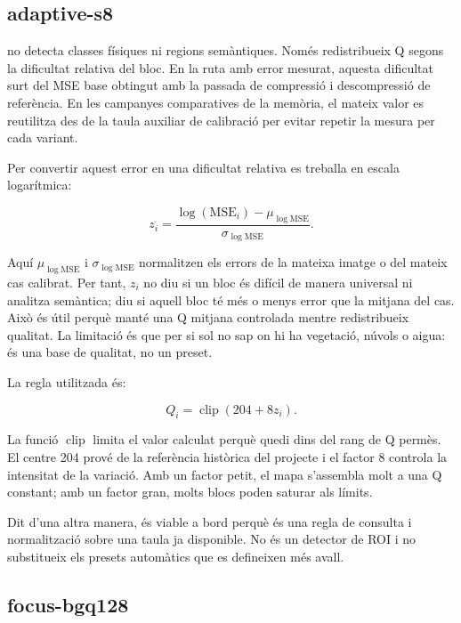 \subsection{adaptive-s8}

 no detecta classes físiques ni regions semàntiques. Només
redistribueix Q segons la dificultat relativa del bloc. En la ruta amb error
mesurat, aquesta dificultat surt del MSE base obtingut amb la passada de
compressió i descompressió de referència. En les campanyes comparatives de la
memòria, el mateix valor es reutilitza des de la taula auxiliar de calibració per
evitar repetir la mesura per cada variant.

Per convertir aquest error en una dificultat relativa es treballa en escala
logarítmica:

\begin{equation}
z_i=
\frac{\log(\mathrm{MSE}_i)-\mu_{\log\mathrm{MSE}}}
{\sigma_{\log\mathrm{MSE}}}.
\end{equation}

Aquí $\mu_{\log\mathrm{MSE}}$ i $\sigma_{\log\mathrm{MSE}}$ normalitzen els errors
de la mateixa imatge o del mateix cas calibrat. Per tant, $z_i$ no diu si un bloc
és difícil de manera universal ni analitza semàntica; diu si aquell bloc té més
o menys error que la mitjana del cas. Això és útil perquè manté una Q mitjana
controlada mentre redistribueix qualitat. La limitació és que 
per si sol no sap on hi ha vegetació, núvols o aigua: és una base de qualitat, no
un preset.

La regla utilitzada és:

\begin{equation}
Q_i=\operatorname{clip}(204+8z_i).
\label{eq:adaptive_s8}
\end{equation}

La funció $\operatorname{clip}$ limita el valor calculat perquè quedi dins del
rang de Q permès. El centre 204 prové de la referència històrica del projecte i
el factor 8 controla la intensitat de la variació. Amb un factor petit, el mapa
s'assembla molt a una Q constant; amb un factor gran, molts blocs poden saturar
als límits.

Dit d'una altra manera,  és viable a bord perquè és una regla
de consulta i normalització sobre una taula ja disponible. No és un detector de
ROI i no substitueix els presets automàtics que es defineixen més avall.

\subsection{focus-bgq128}

